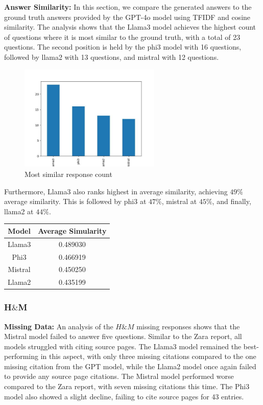 \documentclass[]{article}
\begin{document}
\textbf{Answer Similarity:} 
In this section, 
we compare the generated answers to the ground truth answers provided by the GPT-4o model using TFIDF and 
cosine similarity. The analysis shows that the Llama3 model achieves the highest count of questions where 
it is most similar to the ground truth, with a total of 23 questions. The second position is held by the phi3 
model with 16 questions, followed by llama2 with 13 questions, and mistral with 12 questions.

\begin{figure}[H]
    \centering
    \includegraphics[width=0.6\textwidth]{./images/highest_count_zara.jpg}
    \caption{Most similar response count}
    \label{fig:image_label}
\end{figure}

Furthermore, Llama3 also ranks highest in average similarity, achieving $49\%$ average similarity. This is followed by phi3 at $47\%$, mistral at $45\%$, and finally, llama2 at $44\%$.

\begin{center}
    \begin{tabular}{||c c||} 
     \hline
     \textbf{Model} & \textbf{Average Simularity}  \\ [0.5ex] 
     \hline
     Llama3 & 0.489030 \\ 
     \hline
     Phi3 & 0.466919  \\
     \hline
     Mistral & 0.450250 \\ 
     \hline
     Llama2 & 0.435199  \\
     \hline
    \end{tabular}
\end{center}
    

\subsubsection{H$\&$M}
\textbf{Missing Data:} An analysis of the $H\&M$ missing responses shows that the Mistral model failed to answer 
five questions. Similar to the Zara report, 
all models struggled with citing source pages. 
The Llama3 model remained the best-performing in this aspect, with only three missing citations compared to the one missing citation from the GPT model, 
while the Llama2 model once again failed to provide any source page citations. 
The Mistral model performed worse compared to the Zara report, 
with seven missing citations this time. 
The Phi3 model also showed a slight decline, failing to cite source pages for 43 entries.
\newline\newline
\end{document}
